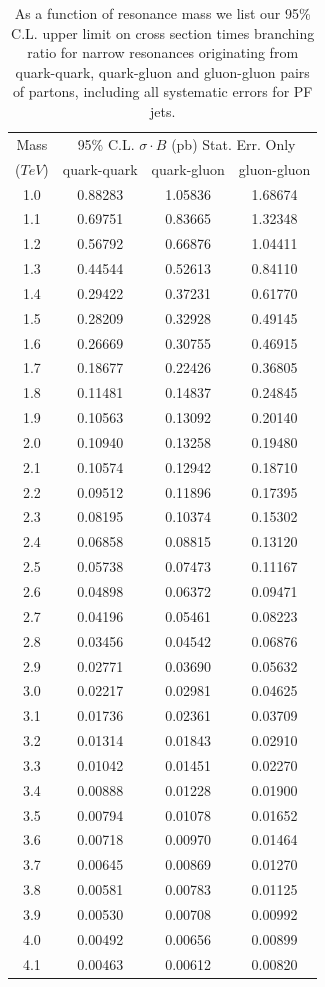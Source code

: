 \clearpage


\begin{table}[htbH]
\centering
\large
\begin{tabular}{|c|c|c|c|}\hline
Mass   &  \multicolumn{3}{c|}{95\% C.L. $\sigma\cdot B$ (pb) Stat. Err. Only}\\
 ($TeV$) & quark-quark       & quark-gluon  & gluon-gluon\\ \hline
1.0 & 0.88283 & 1.05836 & 1.68674 \\
1.1 & 0.69751 & 0.83665 & 1.32348 \\
1.2 & 0.56792 & 0.66876 & 1.04411 \\
1.3 & 0.44544 & 0.52613 & 0.84110 \\
1.4 & 0.29422 & 0.37231 & 0.61770 \\
1.5 & 0.28209 & 0.32928 & 0.49145 \\
1.6 & 0.26669 & 0.30755 & 0.46915 \\
1.7 & 0.18677 & 0.22426 & 0.36805 \\
1.8 & 0.11481 & 0.14837 & 0.24845 \\
1.9 & 0.10563 & 0.13092 & 0.20140 \\
2.0 & 0.10940 & 0.13258 & 0.19480 \\
2.1 & 0.10574 & 0.12942 & 0.18710 \\
2.2 & 0.09512 & 0.11896 & 0.17395 \\
2.3 & 0.08195 & 0.10374 & 0.15302 \\
2.4 & 0.06858 & 0.08815 & 0.13120 \\
2.5 & 0.05738 & 0.07473 & 0.11167 \\
2.6 & 0.04898 & 0.06372 & 0.09471 \\
2.7 & 0.04196 & 0.05461 & 0.08223 \\
2.8 & 0.03456 & 0.04542 & 0.06876 \\
2.9 & 0.02771 & 0.03690 & 0.05632 \\
3.0 & 0.02217 & 0.02981 & 0.04625 \\
3.1 & 0.01736 & 0.02361 & 0.03709 \\
3.2 & 0.01314 & 0.01843 & 0.02910 \\
3.3 & 0.01042 & 0.01451 & 0.02270 \\
3.4 & 0.00888 & 0.01228 & 0.01900 \\
3.5 & 0.00794 & 0.01078 & 0.01652 \\
3.6 & 0.00718 & 0.00970 & 0.01464 \\
3.7 & 0.00645 & 0.00869 & 0.01270 \\
3.8 & 0.00581 & 0.00783 & 0.01125 \\
3.9 & 0.00530 & 0.00708 & 0.00992 \\
4.0 & 0.00492 & 0.00656 & 0.00899 \\
4.1 & 0.00463 & 0.00612 & 0.00820 \\
\hline
\end{tabular}
\caption{As a function of resonance mass we list our 95\% C.L. upper limit on
cross section times branching ratio for narrow resonances originating from
quark-quark, quark-gluon and gluon-gluon pairs of partons, 
including all systematic errors for PF jets.}
\label{tabSysLimit_pf}
\end{table}

